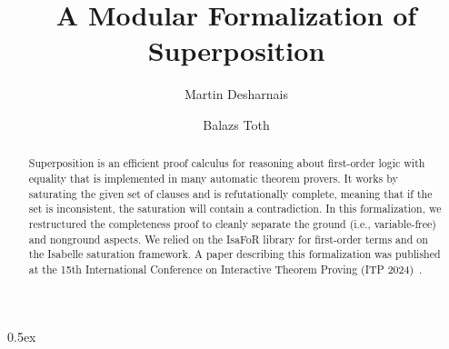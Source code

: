 \documentclass[11pt,a4paper]{article}
\begin{document}
\title{A Modular Formalization of Superposition}
\author{Martin Desharnais \and Balazs Toth}
\maketitle

\begin{abstract}
  Superposition is an efficient proof calculus for reasoning about first-order logic with equality that is implemented in many automatic theorem provers.
  It works by saturating the given set of clauses and is refutationally complete, meaning that if the set is inconsistent, the saturation will contain a contradiction.
  In this formalization, we restructured the completeness proof to cleanly separate the ground (i.e., variable-free) and nonground aspects.
  We relied on the IsaFoR library for first-order terms and on the Isabelle saturation framework.
  A paper describing this formalization was published at the 15th International Conference on Interactive Theorem Proving (ITP 2024)~\cite{Desharnais_ITP2024}.
\end{abstract}

\tableofcontents

\parindent 0pt\parskip 0.5ex





\end{document}
